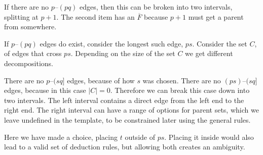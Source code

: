 If there are no $p$--$(pq)$ edges, then this can be broken into two intervals, splitting at $p+1$.
The second item has an $\overline{F}$ because $p+1$ must get a parent from somewhere.


If $p$--$(pq)$ edges do exist, consider the longest such edge, $ps$.
Consider the set $C$, of edges that cross $ps$.
Depending on the size of the set $C$ we get different decompositions.

\begin{center}
\end{center}

There are no $p$--$(sq]$ edges, because of how $s$ was chosen.
There are no $(ps)$--$(sq]$ edges, because in this case $|C| = 0$.
Therefore we can break this case down into two intervals.
The left interval contains a direct edge from the left end to the right end.
The right interval can have a range of options for parent sets, which we leave undefined in the template, to be constrained later using the general rules.


\begin{center}
\end{center}

Here we have made a choice, placing $t$ outside of $ps$.
Placing it inside would also lead to a valid set of deduction rules, but allowing both creates an ambiguity.

